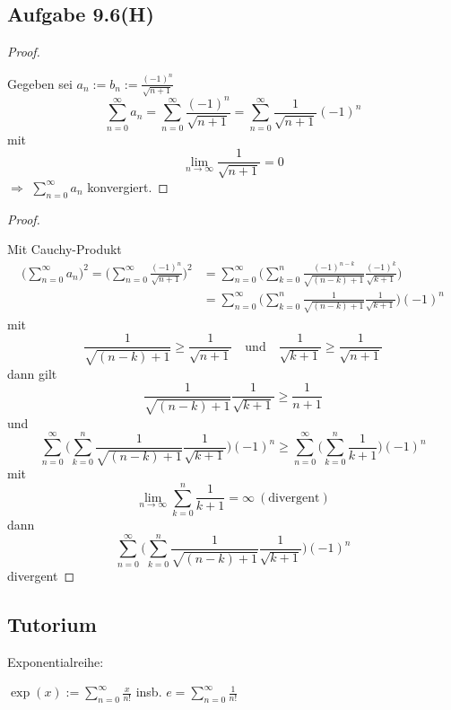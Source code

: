 \newpage

\subsection{Aufgabe 9.6(H)}
\begin{proof}
$ $\newline

Gegeben sei $a_n:=b_n:=\frac{(-1)^n}{\sqrt{n+1}}$
\begin{equation*}
\sum_{n=0}^\infty a_n=\sum_{n=0}^\infty\frac{(-1)^n}{\sqrt{n+1}}=\sum_{n=0}^\infty\frac{1}{\sqrt{n+1}}(-1)^n
\end{equation*}
mit
\begin{equation*}
\lim_{n\rightarrow\infty}\frac{1}{\sqrt{n+1}}=0
\end{equation*}
$\Rightarrow$ $\sum_{n=0}^\infty a_n$ konvergiert.
\end{proof}

\begin{proof}
$ $\newline

Mit Cauchy-Produkt
\begin{align*}
\Bigg(\sum_{n=0}^\infty a_n\Bigg)^2=\Bigg(\sum_{n=0}^\infty\frac{(-1)^n}{\sqrt{n+1}}\Bigg)^2
&=\sum_{n=0}^\infty\Bigg(\sum_{k=0}^n\frac{(-1)^{n-k}}{\sqrt{(n-k)+1}}\frac{(-1)^k}{\sqrt{k+1}}\Bigg)\\
&=\sum_{n=0}^\infty\Bigg(\sum_{k=0}^n\frac{1}{\sqrt{(n-k)+1}}\frac{1}{\sqrt{k+1}}\Bigg)(-1)^n
\end{align*}
mit
\begin{equation*}
\frac{1}{\sqrt{(n-k)+1}}\geq\frac{1}{\sqrt{n+1}}\hspace{1em}\mbox{und}\hspace{1em}\frac{1}{\sqrt{k+1}}\geq\frac{1}{\sqrt{n+1}}
\end{equation*}
dann gilt
\begin{equation*}
\frac{1}{\sqrt{(n-k)+1}}\frac{1}{\sqrt{k+1}}\geq\frac{1}{n+1}
\end{equation*}
und
\begin{equation*}
\sum_{n=0}^\infty\Bigg(\sum_{k=0}^n\frac{1}{\sqrt{(n-k)+1}}\frac{1}{\sqrt{k+1}}\Bigg)(-1)^n\geq\sum_{n=0}^\infty\Bigg(\sum_{k=0}^n\frac{1}{k+1}\Bigg)(-1)^n
\end{equation*}
mit
\begin{equation*}
\lim_{n\rightarrow\infty}\sum_{k=0}^n\frac{1}{k+1}=\infty\ (\mbox{divergent})
\end{equation*}
dann
\begin{equation*}
\sum_{n=0}^\infty\Bigg(\sum_{k=0}^n\frac{1}{\sqrt{(n-k)+1}}\frac{1}{\sqrt{k+1}}\Bigg)(-1)^n
\end{equation*}
divergent
\end{proof}

\newpage

\subsection{Tutorium}

Exponentialreihe:

$\exp(x):=\sum_{n=0}^{\infty}\frac{x}{n!}$ insb. $e=\sum_{n=0}^{\infty}\frac{1}{n!}$

